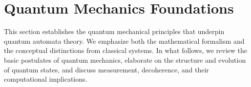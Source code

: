 \section{Quantum Mechanics Foundations}
\label{sec:quantum-foundations}

This section establishes the quantum mechanical principles that underpin quantum automata theory. We emphasize both the mathematical formalism and the conceptual distinctions from classical systems. In what follows, we review the basic postulates of quantum mechanics, elaborate on the structure and evolution of quantum states, and discuss measurement, decoherence, and their computational implications.





 
    